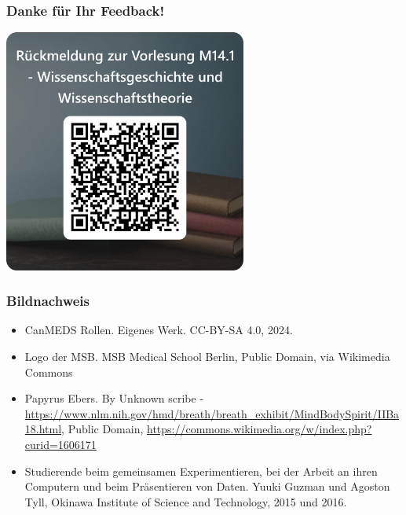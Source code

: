 \documentclass{beamer}
\begin{document}

\begin{frame}
\frametitle{Danke für Ihr Feedback!}
\begin{center}
\includegraphics[width=0.6\textwidth]{feedback_QR.png}
\end{center}

\end{frame}





\begin{frame}
\frametitle{Bildnachweis}

\vfill

\begin{tiny}
 
\begin{itemize}

\item 
CanMEDS Rollen. Eigenes Werk. CC-BY-SA 4.0, 2024. 

\item
Logo der MSB. MSB Medical School Berlin, Public Domain, via Wikimedia Commons
\item 
Papyrus Ebers. By Unknown scribe - \url{https://www.nlm.nih.gov/hmd/breath/breath_exhibit/MindBodySpirit/IIBa18.html}, Public Domain, \url{https://commons.wikimedia.org/w/index.php?curid=1606171}

\item 
Studierende beim gemeinsamen Experimentieren, bei der Arbeit an ihren Computern und beim Präsentieren von Daten. Yuuki Guzman und Agoston Tyll, Okinawa Institute of Science and Technology, 2015 und 2016. 
\end{itemize}
\end{tiny}
\end{frame}
\end{document}
